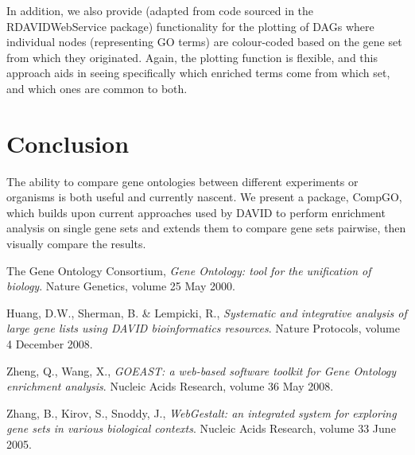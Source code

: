 \documentclass[11pt, oneside]{article}
\begin{document}
In addition, we also provide (adapted from code sourced in the RDAVIDWebService package) functionality for the plotting of DAGs where individual nodes (representing GO terms) are colour-coded based on the gene set from which they originated. Again, the plotting function is flexible, and this approach aids in seeing specifically which enriched terms come from which set, and which ones are common to both.

\section*{Conclusion}
The ability to compare gene ontologies between different experiments or organisms is both useful and currently nascent. We present a package, CompGO, which builds upon current approaches used by DAVID to perform enrichment analysis on single gene sets and extends them to compare gene sets pairwise, then visually compare the results. 


\begin{thebibliography}{}

	The Gene Ontology Consortium, 
	\emph{Gene Ontology: tool for the unification of biology}.
	Nature Genetics, volume 25
	May 2000.

	Huang, D.W., Sherman, B. \& Lempicki, R.,
	\emph{Systematic and integrative analysis of large gene lists using DAVID bioinformatics resources}.
	Nature Protocols, volume 4
	December 2008.

	Zheng, Q., Wang, X.,
	\emph{GOEAST: a web-based software toolkit for Gene Ontology enrichment analysis}.
	Nucleic Acids Research, volume 36
	May 2008.

	Zhang, B., Kirov, S., Snoddy, J.,
	\emph{WebGestalt: an integrated system for exploring gene sets in various biological contexts}.
	Nucleic Acids Research, volume 33
	June 2005.

\end{thebibliography}
\end{document}
